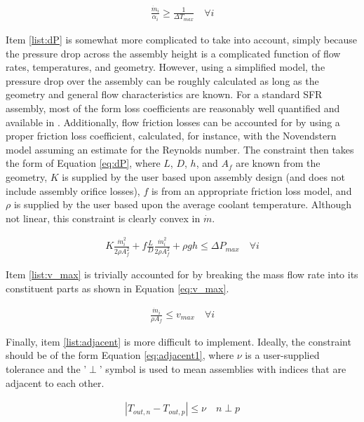\documentclass[11pt, oneside]{article}   	%
\begin{document}
\begin{align}
\frac{\dot{m}_i}{\alpha_i} \geq \frac{1}{\Delta T_{max}} \quad \forall i \label{eq:maxTemp}
\end{align}

Item \ref{list:dP} is somewhat more complicated to take into account, simply because the pressure drop across the assembly height is a complicated function of flow rates, temperatures, and geometry.
However, using a simplified model, the pressure drop over the assembly can be roughly calculated as long as the geometry and general flow characteristics are known.
For a standard SFR assembly, most of the form loss coefficients are reasonably well quantified and available in \cite{Waltar}.
Additionally, flow friction losses can be accounted for by using a proper friction loss coefficient, calculated, for instance, with the Novendstern model assuming an estimate for the Reynolds number.
The constraint then takes the form of Equation \ref{eq:dP}, where $L$, $D$, $h$, and $A_f$ are known from the geometry, $K$ is supplied by the user based upon assembly design (and does not include assembly orifice losses), $f$ is from an appropriate friction loss model, and $\rho$ is supplied by the user based upon the average coolant temperature.
Although not linear, this constraint is clearly convex in $\dot{m}$.

\begin{align}
K \frac{\dot{m}_i^2}{2 \rho A_f^2} + f \frac{L}{D} \frac{\dot{m}_i^2}{2 \rho A_f^2} + \rho g h \leq \Delta P_{max}  \quad \forall i \label{eq:dP}
\end{align}

Item \ref{list:v_max} is trivially accounted for by breaking the mass flow rate into its constituent parts as shown in Equation \ref{eq:v_max}.

\begin{align}
\frac{\dot{m}_i}{\rho A_f} \leq v_{max} \quad \forall i \label{eq:v_max}
\end{align}

Finally, item \ref{list:adjacent} is more difficult to implement. 
Ideally, the constraint should be of the form Equation \ref{eq:adjacent1}, where $\nu$ is a user-supplied tolerance and the '$\perp$' symbol is used to mean assemblies with indices that are adjacent to each other.

\begin{align}
| T_{out,n} - T_{out,p} | \leq \nu \quad n \perp p \label{eq:adjacent1}
\end{align}
\end{document}
